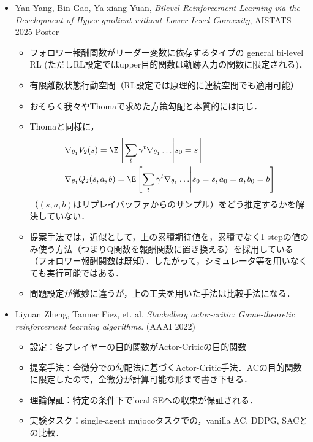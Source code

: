 \documentclass[a4paper,10pt,dvipdfmx]{jsarticle}
\begin{document}
\begin{itemize}
    \begin{itemize}
        \item leaderの目的が一般的な目的関数で書かれているが，我々と同じStackelberg Markov game （leaderの目的関数が累積期待報酬）での勾配計算の方法も提案している
        \item Lower levelの最適化を制約条件とみなして，penaltyありの単レベルの問題（最適化対象の変数はリーダー・フォロワー両者の方策）に変換．
        \item リーダー・フォロワー方策を同時に更新する必要があるので，Centralized training で実行可能．
    \end{itemize}
    \item Yan Yang, Bin Gao, Ya-xiang Yuan, \textit{Bilevel Reinforcement Learning via the Development of Hyper-gradient without Lower-Level Convexity}, AISTATS 2025 Poster\cite{Yang2024-hp}
    \begin{itemize}
        \item フォロワー報酬関数がリーダー変数に依存するタイプの general bi-level RL (ただしRL設定ではupper目的関数は軌跡入力の関数に限定される)．
        \item 有限離散状態行動空間（RL設定では原理的に連続空間でも適用可能）
        \item おそらく我々やThoma\cite{Thoma2024-em}で求めた方策勾配と本質的には同じ．
        \item Thoma\cite{Thoma2024-em}と同様に，
        \begin{align}
            &\nabla_{\theta_1}V_2(s)=\E\left[\sum_{t}\gamma^t\nabla_{\theta_1}\dots\middle|s_0=s\right]\\
            &\nabla_{\theta_1}Q_2(s,a,b)=\E\left[\sum_{t}\gamma^t\nabla_{\theta_1}\dots\middle|s_0=s,a_0=a,b_0=b\right]
        \end{align}
        （$(s,a,b)$はリプレイバッファからのサンプル）をどう推定するかを解決していない．
        \item 提案手法では，近似として，上の累積期待値を，累積でなく1 stepの値のみ使う方法（つまりQ関数を報酬関数に置き換える）を採用している（フォロワー報酬関数は既知）．したがって，シミュレータ等を用いなくても実行可能ではある．
        \item 問題設定が微妙に違うが，上の工夫を用いた手法は比較手法になる．
    \end{itemize}
    \item Liyuan Zheng, Tanner Fiez, et. al. \textit{Stackelberg actor-critic: Game-theoretic reinforcement learning algorithms}. (AAAI 2022)\cite{Zheng2022-xj}
    \begin{itemize}
        \item 設定：各プレイヤーの目的関数がActor-Criticの目的関数
        \item 提案手法：全微分での勾配法\cite{Fiez2020-lu}に基づくActor-Critic手法．ACの目的関数に限定したので，全微分が計算可能な形まで書き下せる．
        \item 理論保証：特定の条件下でlocal SEへの収束が保証される．
        \item 実験タスク：single-agent mujocoタスクでの，vanilla AC, DDPG, SACとの比較．
    \end{itemize}
\end{itemize}
\end{document}
